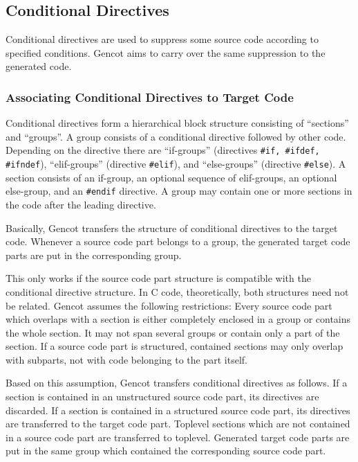 \documentclass[a4paper]{report}
\newcommand{\code}[1]{\textnormal{\texttt{#1}}}
\begin{document}
\subsection{Conditional Directives}

Conditional directives are used to suppress some source code according to specified conditions. Gencot aims to
carry over the same suppression to the generated code.

\subsubsection{Associating Conditional Directives to Target Code}

Conditional directives form a hierarchical block structure consisting of ``sections'' and ``groups''. A group
consists of a conditional directive followed by other code. Depending on the directive there are ``if-groups''
(directives \code{\#if, \#ifdef, \#ifndef}), ``elif-groups'' (directive \code{\#elif}), and ``else-groups''
(directive \code{\#else}). A section consists of an if-group, an optional sequence of elif-groups, an optional
else-group, and an \code{\#endif} directive. A group may contain one or more sections in the code after the
leading directive.

Basically, Gencot transfers the structure of conditional directives to the target code. Whenever a source code
part belongs to a group, the generated target code parts are put in the corresponding group. 

This only works if the source code part structure is compatible with the conditional directive structure.
In C code, theoretically, both structures need not be related. Gencot assumes the following restrictions:
Every source code part which overlaps with a section is either completely enclosed in a group or
contains the whole section. It may not span several groups or contain only a part of the section. If a
source code part is structured, contained sections may only overlap with subparts, not with code belonging
to the part itself. 

Based on this assumption, Gencot transfers conditional directives as follows. If a section is contained in an 
unstructured source code part, its directives are discarded. If a section is contained in a structured source
code part, its directives are transferred to the target code part. Toplevel sections which are not contained in
a source code part are transferred to toplevel. Generated target code parts are put in the same group which
contained the corresponding source code part.
\end{document}
